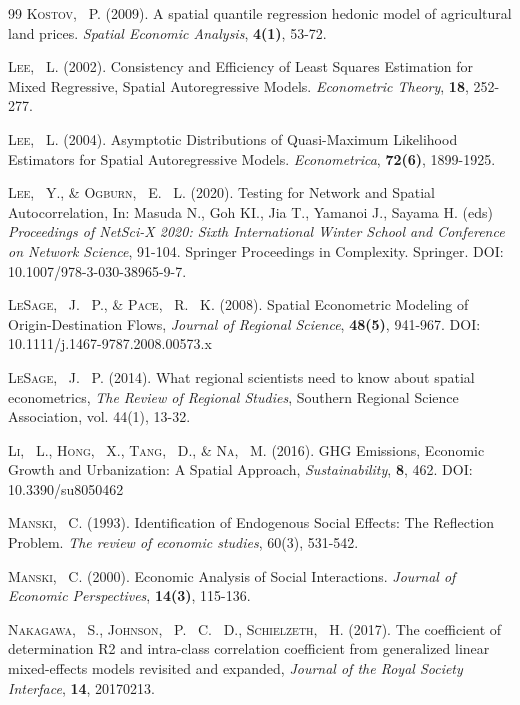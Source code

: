 \documentclass[times, doublespace]{auth}
\begin{document}
\begin{thebibliography}{99}
\textsc{Kostov, ~P.} (2009). A spatial quantile regression hedonic model of agricultural land prices. \textit{Spatial Economic Analysis}, \textbf{4(1)}, 53-72.

\textsc{Lee, ~L.} (2002). Consistency and Efficiency of Least Squares Estimation for Mixed Regressive, Spatial Autoregressive Models. \textit{Econometric Theory}, \textbf{18}, 252-277.

\textsc{Lee, ~L.} (2004). Asymptotic Distributions of Quasi-Maximum Likelihood Estimators for Spatial Autoregressive Models. \textit{Econometrica}, \textbf{72(6)}, 1899-1925.

\textsc{Lee, ~Y., \& Ogburn, ~E. ~L.} (2020). Testing for Network and Spatial Autocorrelation, In: Masuda N., Goh KI., Jia T., Yamanoi J., Sayama H. (eds) \textit{Proceedings of NetSci-X 2020: Sixth International Winter School and Conference on Network Science}, 91-104. Springer Proceedings in Complexity. Springer. DOI: 10.1007/978-3-030-38965-9-7. 

\textsc{LeSage, ~J. ~P., \& Pace, ~R. ~K.} (2008). Spatial Econometric Modeling of Origin-Destination Flows, \textit{Journal of Regional Science}, \textbf{48(5)}, 941-967. DOI: 10.1111/j.1467-9787.2008.00573.x

\textsc{LeSage, ~J. ~P.} (2014).
What regional scientists need to know about spatial econometrics,
\textit{The Review of Regional Studies}, Southern Regional Science Association, vol. 44(1), 13-32.

\textsc{Li, ~L., Hong, ~X., Tang, ~D., \& Na, ~M.} (2016). GHG Emissions, Economic Growth and Urbanization: A Spatial Approach, \textit{Sustainability}, \textbf{8}, 462. DOI: 10.3390/su8050462

\textsc{Manski, ~C.} (1993). Identification of Endogenous Social Effects: The Reflection Problem. \textit{The review of economic studies}, 60(3), 531-542.

\textsc{Manski, ~C.} (2000). Economic Analysis of Social Interactions. \textit{Journal of Economic Perspectives}, \textbf{14(3)}, 115-136.

\textsc{Nakagawa, ~S., Johnson, ~P. ~C. ~D., Schielzeth, ~H.} (2017). The coefficient of determination R2 and intra-class correlation coefficient from generalized linear mixed-effects models revisited and expanded, \textit{Journal of the Royal Society Interface}, \textbf{14}, 20170213.


\end{thebibliography}
\end{document}
